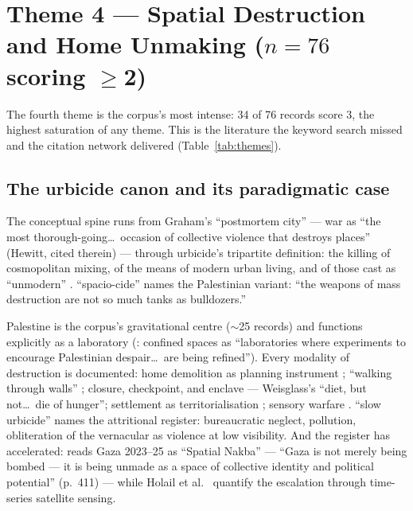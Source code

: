 \section{Theme 4 — Spatial Destruction and Home Unmaking (\texorpdfstring{$n=76$ scoring $\geq$2}{n=76 scoring ≥2})}
\label{sec:theme4}

The fourth theme is the corpus's most intense: 34 of 76 records score 3, the highest saturation of any theme. This is the literature the keyword search missed and the citation network delivered (Table~\ref{tab:themes}).

\subsection{The urbicide canon and its paradigmatic case}

The conceptual spine runs from Graham's \citeyearpar{graham2004} ``postmortem city'' — war as ``the most thorough-going\dots\ occasion of collective violence that destroys places'' (Hewitt, cited therein) — through urbicide's tripartite definition: the killing of cosmopolitan mixing, of the means of modern urban living, and of those cast as ``unmodern'' \parencite[p.~148]{graham2012}. \textcite[pp.~190,192]{hanafi2012} ``spacio-cide'' names the Palestinian variant: ``the weapons of mass destruction are not so much tanks as bulldozers.''

Palestine is the corpus's gravitational centre ($\sim$25 records) and functions explicitly as a laboratory (\cite[p.~7]{cook2008}: confined spaces as ``laboratories where experiments to encourage Palestinian despair\dots\ are being refined''). Every modality of destruction is documented: home demolition as planning instrument \parencite{meade2011,pazfuchs2010}; ``walking through walls'' \parencite{bleibleh2015}; closure, checkpoint, and enclave \parencite[p.~10]{peteet2015} — Weisglass's ``diet, but not\dots\ die of hunger''; settlement as territorialisation \parencite{volinz2019}; sensory warfare \parencite{shalhoub2017}. \textcite[p.~1]{golanska2022} ``slow urbicide'' names the attritional register: bureaucratic neglect, pollution, obliteration of the vernacular as violence at low visibility. And the register has accelerated: \textcite[p.~399]{benguita2025} reads Gaza 2023–25 as ``Spatial Nakba'' — ``Gaza is not merely being bombed — it is being unmade as a space of collective identity and political potential'' (p.~411) — while Holail et al.\ \citeyearpar{holail2024} quantify the escalation through time-series satellite sensing.

